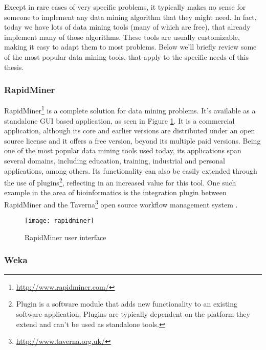Except in rare cases of very specific problems, it typically makes no sense for
someone to implement any data mining algorithm that they might need. In fact,
today we have lots of data mining tools (many of which are free), that already
implement many of those algorithms. These tools are usually customizable, making
it easy to adapt them to most problems. Below we'll briefly review some of the
most popular data mining tools, that apply to the specific needs of this thesis.

\subsubsection{RapidMiner}

RapidMiner\footnote{\url{http://www.rapidminer.com/}} is a complete solution for
data mining problems. It's available as a standalone GUI based application, as
seen in Figure \ref{fig:rapidminer}. It is a commercial application, although
its core and earlier versions are distributed under an open source license and
it offers a free version, beyond its multiple paid versions. Being one of the
most popular data mining tools used today, its applications span several
domains, including education, training, industrial and personal applications,
among others. Its functionality can also be easily extended through the use of
plugins\footnote{Plugin is a software module that adds new functionality to an
existing software application. Plugins are typically dependent on the platform
they extend and can't be used as standalone tools.}, reflecting in an increased
value for this tool. One such example in the area of bioinformatics is the
integration plugin between RapidMiner and the
Taverna\footnote{\url{http://www.taverna.org.uk/}} open source workflow
management system \cite{Jupp2011}.

\begin{figure}[!htb]
  \begin{center}
    \leavevmode
    \texttt{[image: rapidminer]}
    \caption{RapidMiner user interface}
    \label{fig:rapidminer}
  \end{center}
\end{figure}

\subsubsection{Weka}

